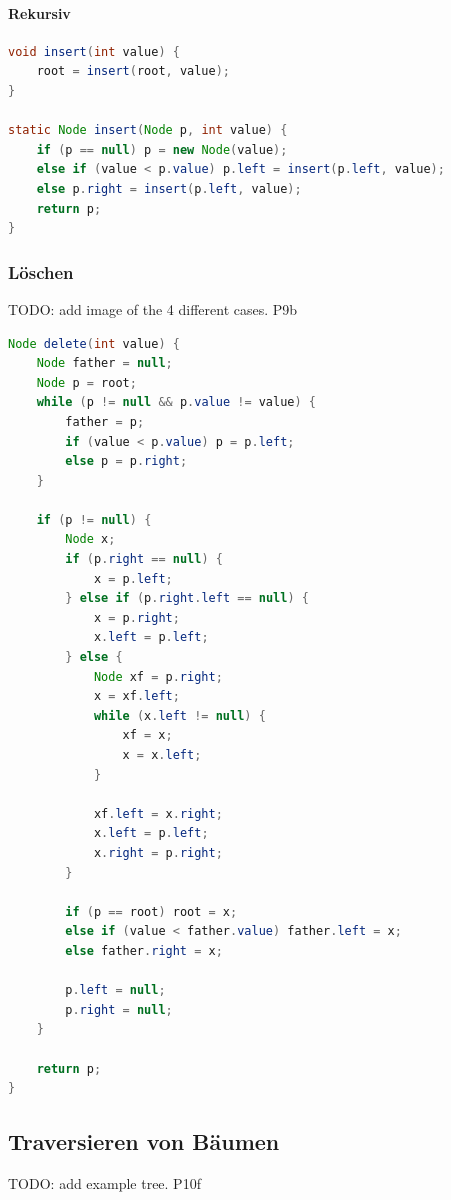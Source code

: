 \documentclass{article}
\begin{document}
\paragraph{Rekursiv}

\begin{lstlisting}[language=java, tabsize=4]
void insert(int value) {
    root = insert(root, value);
}

static Node insert(Node p, int value) {
    if (p == null) p = new Node(value);
    else if (value < p.value) p.left = insert(p.left, value);
    else p.right = insert(p.left, value);
    return p;
}
\end{lstlisting}

\subsubsection{Löschen}

TODO: add image of the 4 different cases. P9b

\begin{lstlisting}[language=java, tabsize=4]
Node delete(int value) {
    Node father = null;
    Node p = root;
    while (p != null && p.value != value) {
        father = p;
        if (value < p.value) p = p.left;
        else p = p.right;
    }
    
    if (p != null) {
        Node x;
        if (p.right == null) {
            x = p.left;
        } else if (p.right.left == null) {
            x = p.right;
            x.left = p.left;
        } else {
            Node xf = p.right;
            x = xf.left;
            while (x.left != null) {
                xf = x;
                x = x.left;
            }
            
            xf.left = x.right;
            x.left = p.left;
            x.right = p.right;
        }
        
        if (p == root) root = x;
        else if (value < father.value) father.left = x;
        else father.right = x;
        
        p.left = null;
        p.right = null;
    }
    
    return p;
}
\end{lstlisting}
\newpage

\subsection{Traversieren von Bäumen}

TODO: add example tree. P10f
\end{document}
